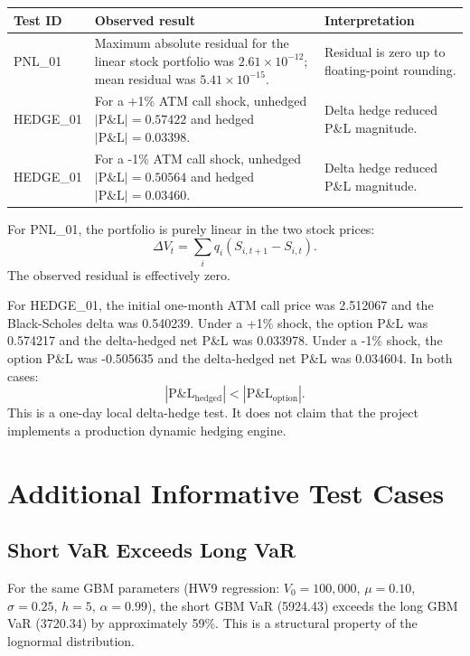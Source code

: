 \documentclass[11pt]{article}
\begin{document}
\begin{center}
\small
\begin{tabular}{L{2cm}L{5.5cm}L{5.5cm}}
\toprule
\textbf{Test ID} & \textbf{Observed result} & \textbf{Interpretation} \\
\midrule
PNL\_01 & Maximum absolute residual for the linear stock portfolio was $2.61 \times 10^{-12}$; mean residual was $5.41 \times 10^{-15}$. & Residual is zero up to floating-point rounding. \\
HEDGE\_01 & For a +1\% ATM call shock, unhedged $|\mathrm{P\&L}|=0.57422$ and hedged $|\mathrm{P\&L}|=0.03398$. & Delta hedge reduced P\&L magnitude. \\
HEDGE\_01 & For a -1\% ATM call shock, unhedged $|\mathrm{P\&L}|=0.50564$ and hedged $|\mathrm{P\&L}|=0.03460$. & Delta hedge reduced P\&L magnitude. \\
\bottomrule
\end{tabular}
\end{center}

For PNL\_01, the portfolio is purely linear in the two stock prices:
\[
  \Delta V_t = \sum_i q_i (S_{i,t+1} - S_{i,t}).
\]
The observed residual is effectively zero.

For HEDGE\_01, the initial one-month ATM call price was 2.512067 and the
Black-Scholes delta was 0.540239.  Under a +1\% shock, the option P\&L
was 0.574217 and the delta-hedged net P\&L was 0.033978.  Under a -1\%
shock, the option P\&L was -0.505635 and the delta-hedged net P\&L was
0.034604.  In both cases:
\[
  |\mathrm{P\&L}_{\mathrm{hedged}}|
  <
  |\mathrm{P\&L}_{\mathrm{option}}|.
\]
This is a one-day local delta-hedge test.  It does not claim that the
project implements a production dynamic hedging engine.

\section{Additional Informative Test Cases}

\subsection{Short VaR Exceeds Long VaR}

For the same GBM parameters (HW9 regression: $V_0=100{,}000$,
$\mu=0.10$, $\sigma=0.25$, $h=5$, $\alpha=0.99$), the short GBM VaR
(5924.43) exceeds the long GBM VaR (3720.34) by approximately 59\%.
This is a structural property of the lognormal distribution.
\end{document}
